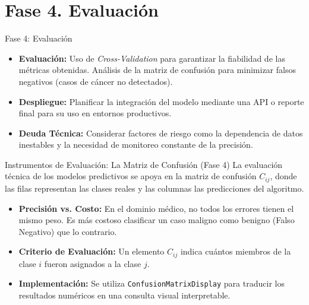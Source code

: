 \documentclass{beamer}
\begin{document}
	\section{Fase 4. Evaluación}
	\begin{frame}{Fase 4: Evaluación}
		\begin{itemize}
			\item \textbf{Evaluación:} Uso de \textit{Cross-Validation} para garantizar la fiabilidad de las métricas obtenidas. Análisis de la matriz de confusión para minimizar falsos negativos (casos de cáncer no detectados).
			\item<2-> \textbf{Despliegue:} Planificar la integración del modelo mediante una API o reporte final para su uso en entornos productivos.
			\item<3-> \textbf{Deuda Técnica:} Considerar factores de riesgo como la dependencia de datos inestables y la necesidad de monitoreo constante de la precisión.
		\end{itemize}
	\end{frame}
	
	\begin{frame}{Instrumentos de Evaluación: La Matriz de Confusión (Fase 4)}
		La evaluación técnica de los modelos predictivos se apoya en la matriz de confusión $C_{ij}$, donde las filas representan las clases reales y las columnas las predicciones del algoritmo.
		
		\begin{itemize}
			\item<2-> \textbf{Precisión vs. Costo:} En el dominio médico, no todos los errores tienen el mismo peso. Es más costoso clasificar un caso maligno como benigno (Falso Negativo) que lo contrario.
			\item<3-> \textbf{Criterio de Evaluación:} Un elemento $C_{ij}$ indica cuántos miembros de la clase $i$ fueron asignados a la clase $j$.
			\item<4-> \textbf{Implementación:} Se utiliza \texttt{ConfusionMatrixDisplay} para traducir los resultados numéricos en una consulta visual interpretable.
		\end{itemize}
	\end{frame}
	
\end{document}
